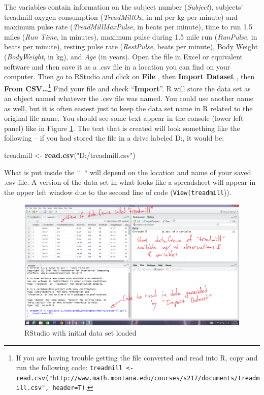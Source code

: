 \documentclass[]{book}
\newenvironment{Shaded}{\begin{snugshade}}{\end{snugshade}}
\newcommand{\KeywordTok}[1]{\textcolor[rgb]{0.13,0.29,0.53}{\textbf{#1}}}
\newcommand{\StringTok}[1]{\textcolor[rgb]{0.31,0.60,0.02}{#1}}
\newcommand{\NormalTok}[1]{#1}
\let\rmarkdownfootnote\footnote%
\def\footnote{\protect\rmarkdownfootnote}
\begin{document}
The variables contain information on the subject number
(\emph{Subject}), subjects' treadmill oxygen consumption
(\emph{TreadMillOx}, in ml per kg per minute) and maximum pulse rate
(\emph{TreadMillMaxPulse}, in beats per minute), time to run 1.5 miles
(\emph{Run Time}, in minutes), maximum pulse during 1.5 mile run
(\emph{RunPulse}, in beats per minute), resting pulse rate
(\emph{RestPulse}, beats per minute), Body Weight (\emph{BodyWeight}, in
kg), and \emph{Age} (in years). Open the file in Excel or equivalent
software and then save it as a .csv file in a location you can find on
your computer. Then go to RStudio and click on \textbf{File} , then
\textbf{Import Dataset} , then \textbf{From CSV\ldots{}}\footnote{If you
  are having trouble getting the file converted and read into R, copy
  and run the following code:
  \texttt{treadmill\ \textless{}-read.csv("http://www.math.montana.edu/courses/s217/documents/treadmill.csv",\ header=T)}.}
Find your file and check ``\textbf{Import}''. R will store the data set
as an object named whatever the .csv file was named. You could use
another name as well, but it is often easiest just to keep the data set
name in R related to the original file name. You should see some text
appear in the console (lower left panel) like in Figure
\ref{fig:Figure3}. The text that is created will look something like the
following -- if you had stored the file in a drive labeled D:, it would
be:

\begin{Shaded}
\begin{Highlighting}[]
\NormalTok{treadmill <-}\StringTok{ }\KeywordTok{read.csv}\NormalTok{(}\StringTok{"D:/treadmill.csv"}\NormalTok{)}
\end{Highlighting}
\end{Shaded}

What is put inside the \texttt{"\ "} will depend on the location and
name of your saved .csv file. A version of the data set in what looks
like a spreadsheet will appear in the upper left window due to the
second line of code (\texttt{View(treadmill})).



\begin{figure}
\includegraphics[width=14.72in]{chapter0_files/image005} \caption{RStudio with initial data set loaded}\label{fig:Figure3}
\end{figure}
\end{document}
